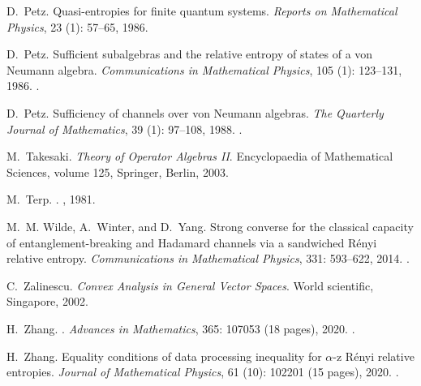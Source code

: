 \documentclass[12pt]{article}
\theoremstyle{definition}
\theoremstyle{remark}
\numberwithin{equation}{section}
\begin{document}
\begin{thebibliography}{27}
D.~Petz.
\newblock Quasi-entropies for finite quantum systems.
\newblock \emph{Reports on Mathematical Physics}, 23 (1):
  57--65, 1986{}.

D.~Petz.
\newblock Sufficient subalgebras and the relative entropy of states of a von
  {Neumann} algebra.
\newblock \emph{Communications in Mathematical Physics}, 105
  (1): 123--131, 1986.
\newblock {}.

D.~Petz.
\newblock Sufficiency of channels over von {Neumann} algebras.
\newblock \emph{The Quarterly Journal of Mathematics}, 39
  (1): 97--108, 1988.
\newblock {}.

M.~Takesaki.
\newblock \emph{Theory of Operator Algebras II}.
\newblock Encyclopaedia of Mathematical Sciences, volume 125, Springer, Berlin, 2003.

M.~Terp.
.
, {1981}.

M.~M. Wilde, A.~Winter, and D.~Yang.
\newblock Strong converse for the classical capacity of entanglement-breaking
  and {Hadamard channels via a sandwiched R{\'e}nyi} relative entropy.
\newblock \emph{Communications in Mathematical Physics}, 331:
  593--622, 2014.
\newblock {}.

C.~Zalinescu.
\newblock \emph{Convex Analysis in General Vector Spaces}.
\newblock World scientific, Singapore, 2002.

H.~Zhang.
.
\newblock \emph{Advances in Mathematics}, 365: 107053 (18 pages),
  2020{}.
\newblock {}.

H.~Zhang.
\newblock Equality conditions of data processing inequality for $\alpha$-z
  {R}{\'e}nyi relative entropies.
\newblock \emph{Journal of Mathematical Physics}, 61 (10):
102201 (15 pages), 2020{}.
\newblock {}.

\end{thebibliography}
\end{document}
